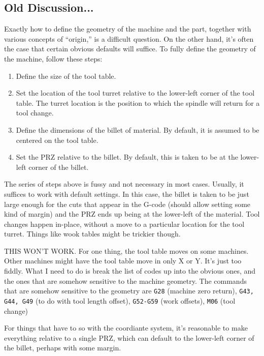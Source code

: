 \documentclass[titlepage,oneside,10pt]{article}
\begin{document}
\vskip 2cm 




\subsection{Old Discussion...}


Exactly how to define the geometry of the machine and the part,
together with various concepts of ``origin,'' is a difficult
question. On the other hand, it's often the case that certain obvious
defaults will suffice. To fully define the geometry of the machine,
follow these steps:
\begin{enumerate}
  \item Define the size of the tool table.
  \item Set the location of the tool turret relative to the lower-left
    corner of the tool table. The turret location is the position to
    which the spindle will return for a tool change.
  \item Define the dimensions of the billet of material. By default,
    it is assumed to be centered on the tool table.
  \item Set the PRZ relative to the billet. By default, this is taken
    to be at the lower-left corner of the billet.
\end{enumerate}  
The series of steps above is fussy and not necessary in most
cases. Usually, it suffices to work with default settings. In this
case, the billet is taken to be just large enough for the cuts that
appear in the G-code (should allow setting some kind of margin) and
the PRZ ends up being at the lower-left of the material. Tool changes
happen in-place, without a move to a particular location for the tool
turret. Things like wook tables might be trickier though.

THIS WON'T WORK. For one thing, the tool table moves on some
machines. Other machines might have the tool table move in only X or
Y. It's just too fiddly. What I need to do is break the list of codes
up into the obvious ones, and the ones that are somehow sensitive to
the machine geometry. The commands that are somehow sensitive to the
geometry are {\tt G28} (machine zero return), {\tt G43, G44, G49} (to
do with tool length offset), {\tt G52-G59} (work offsets), {\tt M06}
(tool change)

For things that have to so with the coordiante system, it's reasonable
to make everything relative to a single PRZ, which can default to the
lower-left corner of the billet, perhaps with some margin.
\end{document}
